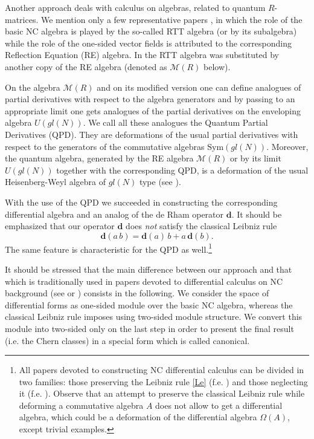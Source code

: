 \documentclass[10pt,a4paper]{amsart}
\newcommand{\MM}{\mathcal{M}}
\newcommand{\Om}{\Omega}
\newcommand{\dd}{\mathbf{d}}
\numberwithin{equation}{section}
\begin{document}
Another approach deals with calculus on algebras, related to  quantum $R$-matrices. We  mention only a few representative
papers  \cite{BM, FP, P, WZ, W}, in which the role of the basic NC algebra is played by the so-called RTT algebra (or by its subalgebra)
while the role of the one-sided vector fields is attributed to the corresponding Reflection Equation (RE) algebra. In \cite{GPS2} the RTT
algebra was substituted by another copy of the RE algebra  (denoted as $\MM(R)$ below).

On the algebra $\MM(R)$  and on its modified version one can define analogues of partial derivatives with respect
to the algebra generators and by passing to an appropriate limit one gets analogues of the partial derivatives on the enveloping algebra
$U(gl(N))$. We call all these analogues the Quantum Partial Derivatives (QPD). They are deformations of the usual partial derivatives with
respect to the generators of the commutative algebras $\mathrm{Sym}(gl(N))$. Moreover, the quantum  algebra, generated by the RE
algebra $\MM(R)$ or by its limit $U(gl(N))$ together with the corresponding QPD, is a deformation of the usual Heisenberg-Weyl
algebra of $gl(N)$ type (see \cite{GPS2}).

With the use of the QPD we succeeded in constructing the corresponding differential algebra and an analog of the de Rham operator
$\dd$. It should be emphasized that our operator $\dd$ does \emph{not} satisfy the classical Leibniz rule
\begin{equation}
\dd(a\, b)=\dd(a)\, b+a\, \dd (b).
\label{Le}
\end{equation}
The same feature is characteristic for the QPD  as well.\footnote{All papers devoted to constructing NC differential calculus can be divided in two
families: those preserving the Leibniz rule \eqref{Le} (f.e. \cite{BM})   and those neglecting it (f.e. \cite{FP}). Observe that an attempt to
preserve the classical Leibniz rule while deforming a  commutative algebra $A$ does not allow to get a differential algebra, which could
be a deformation of the differential algebra $\Om(A)$, except trivial examples. }

It should be stressed that the main difference between our approach and that which is traditionally used in papers devoted to  differential calculus  on NC
background (see \cite{DVL} or \cite{La}) consists in the following. We consider the space of differential forms as one-sided module over the basic NC algebra, whereas
the classical Leibniz rule imposes using two-sided module structure.
We convert this module into two-sided only on the last step in order to present the final result (i.e. the Chern classes) in a special form  which is called canonical.
\end{document}
